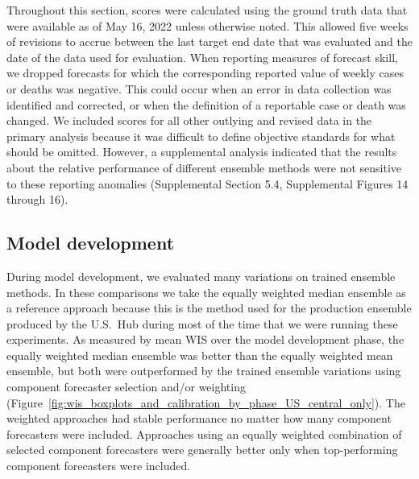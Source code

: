 \documentclass[11pt,3p,authoryear]{elsarticle}
\begin{document}
Throughout this section, scores were calculated using the ground truth data that were available as of May 16, 2022 unless otherwise noted. This allowed five weeks of revisions to accrue between the last target end date that was evaluated and the date of the data used for evaluation. When reporting measures of forecast skill, we dropped forecasts for which the corresponding reported value of weekly cases or deaths was negative. This could occur when an error in data collection was identified and corrected, or when the definition of a reportable case or death was changed. We included scores for all other outlying and revised data in the primary analysis because it was difficult to define objective standards for what should be omitted. However, a supplemental analysis indicated that the results about the relative performance of different ensemble methods were not sensitive to these reporting anomalies (Supplemental Section 5.4, Supplemental Figures 14 through 16).

\subsection{Model development}
\label{subsec:results_development}

During model development, we evaluated many variations on trained ensemble methods. In these comparisons we take the equally weighted median ensemble as a reference approach because this is the method used for the production ensemble produced by the U.S.\ Hub during most of the time that we were running these experiments. As measured by mean WIS over the model development phase, the equally weighted median ensemble was better than the equally weighted mean ensemble, but both were outperformed by the trained ensemble variations using component forecaster selection and/or weighting (Figure~\ref{fig:wis_boxplots_and_calibration_by_phase_US_central_only}). The weighted approaches had stable performance no matter how many component forecasters were included. Approaches using an equally weighted combination of selected component forecasters were generally better only when top-performing component forecasters were included.
\end{document}
